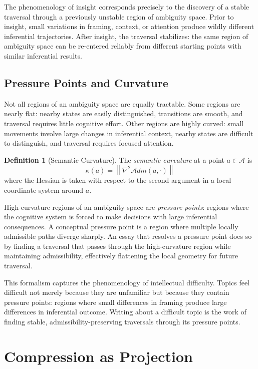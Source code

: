 \documentclass[12pt,oneside]{book}
\theoremstyle{plain}
\theoremstyle{definition}
\newtheorem{definition}[theorem]{Definition}
\theoremstyle{plain}
\newcommand{\cA}{\mathcal{A}}
\begin{document}
The phenomenology of insight corresponds precisely to the discovery of a stable traversal through a previously unstable region of ambiguity space. Prior to insight, small variations in framing, context, or attention produce wildly different inferential trajectories. After insight, the traversal stabilizes: the same region of ambiguity space can be re-entered reliably from different starting points with similar inferential results.

\section{Pressure Points and Curvature}

Not all regions of an ambiguity space are equally tractable. Some regions are nearly flat: nearby states are easily distinguished, transitions are smooth, and traversal requires little cognitive effort. Other regions are highly curved: small movements involve large changes in inferential context, nearby states are difficult to distinguish, and traversal requires focused attention.

\begin{definition}[Semantic Curvature]
The \emph{semantic curvature} at a point $a \in \cA$ is
\[
\kappa(a) = \left\|\nabla^2 \mathcal{A}dm(a, \cdot)\right\|
\]
where the Hessian is taken with respect to the second argument in a local coordinate system around $a$.
\end{definition}

High-curvature regions of an ambiguity space are \emph{pressure points}: regions where the cognitive system is forced to make decisions with large inferential consequences. A conceptual pressure point is a region where multiple locally admissible paths diverge sharply. An essay that resolves a pressure point does so by finding a traversal that passes through the high-curvature region while maintaining admissibility, effectively flattening the local geometry for future traversal.

This formalism captures the phenomenology of intellectual difficulty. Topics feel difficult not merely because they are unfamiliar but because they contain pressure points: regions where small differences in framing produce large differences in inferential outcome. Writing about a difficult topic is the work of finding stable, admissibility-preserving traversals through its pressure points.

\chapter{Compression as Projection}
\label{ch:compression}
\end{document}
